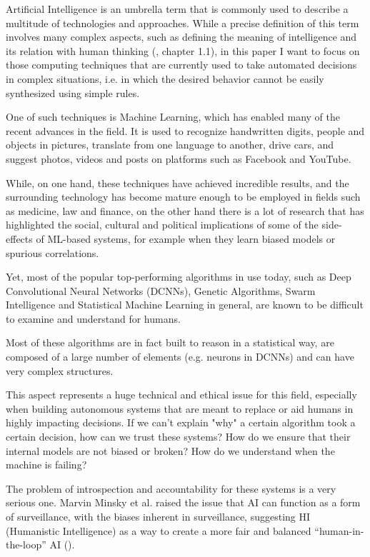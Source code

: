 \documentclass[conference]{IEEEtran}
\begin{document}
Artificial Intelligence is an umbrella term that is commonly used to describe a
multitude of technologies and approaches. While a precise definition of this
term involves many complex aspects, such as defining the meaning of intelligence
and its relation with human thinking (\cite{norvig}, chapter 1.1), in this
paper I want to focus on those computing techniques that are currently used to
take automated decisions in complex situations, i.e. in which the desired
behavior cannot be easily synthesized using simple rules.

One of such techniques is Machine Learning, which has enabled many of the recent
advances in the field. It is used to recognize handwritten digits, people and
objects in pictures, translate from one language to another, drive cars, and
suggest photos, videos and posts on platforms such as Facebook and YouTube.

While, on one hand, these techniques have achieved incredible results, and the
surrounding technology has become mature enough to be employed in fields such as
medicine, law and finance, on the other hand there is a lot of research that has
highlighted the social, cultural and political implications of some of the
side-effects of ML-based systems, for example when they learn biased models or
spurious correlations.

Yet, most of the popular top-performing algorithms in use today, such as Deep
Convolutional Neural Networks (DCNNs), Genetic Algorithms, Swarm Intelligence
and Statistical Machine Learning in general, are known to be difficult to
examine and understand for humans.

Most of these algorithms are in fact built to reason in a statistical way, are
composed of a large number of elements (e.g. neurons in DCNNs) and can have very
complex structures.

This aspect represents a huge technical and ethical issue for this field,
especially when building autonomous systems that are meant to replace or aid
humans in highly impacting decisions. If we can't explain "why" a certain
algorithm took a certain decision, how can we trust these systems? How do we
ensure that their internal models are not biased or broken? How do we understand
when the machine is failing?

The problem of introspection and accountability for these systems is a very
serious one. Marvin Minsky et al. raised the issue that AI can function as a
form of surveillance, with the biases inherent in surveillance, suggesting HI
(Humanistic Intelligence) as a way to create a more fair and balanced
``human-in-the-loop'' AI (\cite{minsky}).
\end{document}
